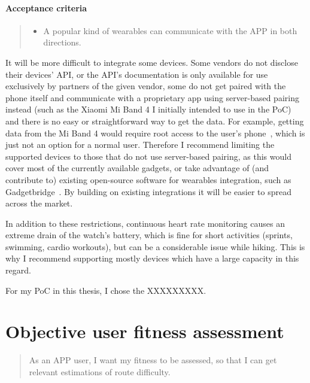\paragraph*{Acceptance criteria}
\begin{quote}
\begin{itemize}
    \item A popular kind of wearables can communicate with the APP in both directions.
\end{itemize}
\end{quote}

It will be more difficult to integrate some devices.
Some vendors do not disclose their devices' API, or the API's documentation is only available for use exclusively by partners of the given vendor,
some do not get paired with the phone itself and communicate with a proprietary app using server-based pairing instead (such as the Xiaomi Mi Band 4 I initially intended to use in the PoC) and there is no easy or straightforward way to get the data.
For example, getting data from the Mi Band 4 would require root access to the user's phone~\cite{miband4-server-based}, which is just not an option for a normal user.
Therefore I recommend limiting the supported devices to those that do not use server-based pairing, as this would cover most of the currently available gadgets,
or take advantage of (and contribute to) existing open-source software for wearables integration, such as Gadgetbridge~\cite{Gadgetbridge}.
By building on existing integrations it will be easier to spread across the market.

In addition to these restrictions, continuous heart rate monitoring causes an extreme drain of the watch's battery, which is fine for short activities (sprints, swimming, cardio workouts), but can be a considerable issue while hiking.
This is why I recommend supporting mostly devices which have a large capacity in this regard.

For my PoC in this thesis, I chose the XXXXXXXXX.


\section{Objective user fitness assessment}\label{epic:fit}
\begin{quote}
As an APP user, I want my fitness to be assessed, so that I can get relevant estimations of route difficulty.
\end{quote}

